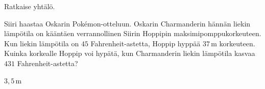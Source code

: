 \begin{multicols}{2}
\begin{tehtava}
	Ratkaise yhtälö.
	\begin{vastaus}
	\end{vastaus}
\end{tehtava}

\begin{tehtava}
Siiri haastaa Oskarin Pokémon-otteluun. Oskarin Charmanderin hännän liekin lämpötila on kääntäen verrannollinen Siirin Hoppipin maksimipomppukorkeuteen. Kun liekin lämpötila on $45$ Fahrenheit-astetta, Hoppip hyppää $37$\,m korkeuteen. Kuinka korkealle Hoppip voi hypätä, kun Charmanderin liekin lämpötila kasvaa $431$ Fahrenheit-astetta? %
	\begin{vastaus}
	$3,5$\,m
	\end{vastaus}
\end{tehtava}

\end{multicols}

